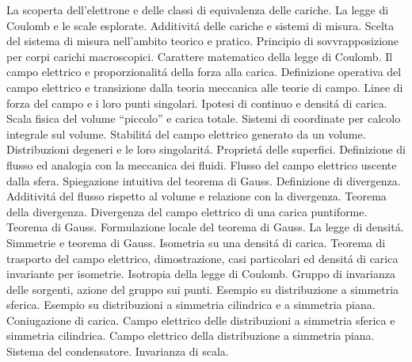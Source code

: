 \begin{multicols}{3}
  La scoperta dell'elettrone e delle classi di equivalenza delle cariche. La legge di Coulomb e le scale esplorate.
  Additivit\'a delle cariche e sistemi di misura.
  Scelta del sistema di misura nell'ambito teorico e pratico. Principio di sovvrapposizione per corpi carichi macroscopici.
  Carattere matematico della legge di Coulomb. Il campo elettrico e proporzionalit\'a della forza alla carica.
  Definizione operativa del campo elettrico e transizione dalla teoria meccanica alle teorie di campo.
  Linee di forza del campo e i loro punti singolari. Ipotesi di continuo e densit\'a di carica.
  Scala fisica del volume ``piccolo'' e carica totale.
  Sistemi di coordinate per calcolo integrale sul volume.
  Stabilit\'a del campo elettrico generato da un volume. Distribuzioni degeneri e le loro singolarit\'a.
  Propriet\'a delle superfici. Definizione di flusso ed analogia con la meccanica dei fluidi.
  Flusso del campo elettrico uscente dalla sfera. Spiegazione intuitiva del teorema di Gauss. Definizione di divergenza.
  Additivit\'a del flusso rispetto al volume e relazione con la divergenza. Teorema della divergenza.
  Divergenza del campo elettrico di una carica puntiforme. Teorema di Gauss.
  Formulazione locale del teorema di Gauss. La legge di densit\'a.
  Simmetrie e teorema di Gauss. Isometria su una densit\'a di carica.
  Teorema di trasporto del campo elettrico, dimostrazione, casi particolari ed densit\'a di carica invariante per isometrie.
  Isotropia della legge di Coulomb. Gruppo di invarianza delle sorgenti, azione del gruppo sui punti.
  Esempio su distribuzione a simmetria sferica.
  Esempio su distribuzioni a simmetria cilindrica e a simmetria piana. Coniugazione di carica.
  Campo elettrico delle distribuzioni a simmetria sferica e simmetria cilindrica.
  Campo elettrico della distribuzione a simmetria piana.
  Sistema del condensatore.
  Invarianza di scala.
\end{multicols}

